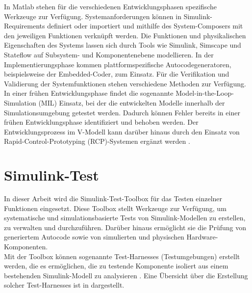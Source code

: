 In Matlab stehen für die verschiedenen Entwicklungsphasen spezifische Werkzeuge zur Verfügung. Systemanforderungen können in Simulink-Requirements definiert oder importiert und mithilfe des System-Composers mit den jeweiligen Funktionen verknüpft werden. Die Funktionen und physikalischen Eigenschaften des Systems lassen sich durch Tools wie Simulink, Simscape und Stateflow auf Subsystem- und Komponentenebene modellieren. In der Implementierungsphase kommen plattformspezifische Autocodegeneratoren, beispielsweise der Embedded-Coder, zum Einsatz. Für die Verifikation und Validierung der Systemfunktionen stehen verschiedene Methoden zur Verfügung. In einer frühen Entwicklungsphase findet die sogenannte Model-in-the-Loop-Simulation (MIL) Einsatz, bei der die entwickelten Modelle innerhalb der Simulationsumgebung getestet werden. Dadurch können Fehler bereits in einer frühen Entwicklungsphase identifiziert und behoben werden. Der Entwicklungsprozess im V-Modell kann darüber hinaus durch den Einsatz von Rapid-Control-Prototyping (RCP)-Systemen ergänzt werden \cite{Skript_Baur_Modbas}.

\section{Simulink-Test}
\label{sec_simulink_test}
In dieser Arbeit wird die Simulink-Test-Toolbox für das Testen einzelner Funktionen eingesetzt. Diese Toolbox stellt Werkzeuge zur Verfügung, um systematische und simulationsbasierte Tests von Simulink-Modellen zu erstellen, zu verwalten und durchzuführen. Darüber hinaus ermöglicht sie die Prüfung von generiertem Autocode sowie von simulierten und physischen Hardware-Komponenten.\\
Mit der Toolbox können sogenannte Test-Harnesses (Testumgebungen) erstellt werden, die es ermöglichen, die zu testende Komponente isoliert aus einem bestehenden Simulink-Modell zu analysieren \cite{Simulink_Test_Toolbox}. Eine Übersicht über die Erstellung solcher Test-Harnesses ist in  dargestellt.

